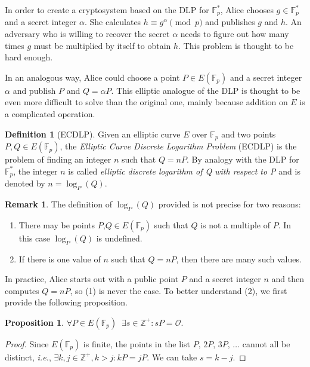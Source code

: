 \documentclass[9pt]{article}
\theoremstyle{definition}
\newtheorem{definition}{Definition}[section]
\newtheorem{proposition}{Proposition}[section]
\newtheorem*{remark}{Remark}
\begin{document}
In order to create a cryptosystem based on the DLP for $\mathbb{F}_p^\ast$, Alice chooses $g \in \mathbb{F}_p^\ast$ and a secret integer $\alpha$. She calculates $h \equiv g^\alpha \pmod{p}$ and publishes $g$ and $h$. An adversary who is willing to recover the secret $\alpha$ needs to figure out how many times $g$ must be multiplied by itself to obtain $h$. This problem is thought to be hard enough.

In an analogous way, Alice could choose a point $P \in E(\mathbb{F}_p)$ and a secret integer $\alpha$ and publish $P$ and $Q = \alpha P$. This elliptic analogue of the DLP is thought to be even more difficult to solve than the original one, mainly because addition on $E$ is a complicated operation.

\begin{definition}[ECDLP]
	Given an elliptic curve $E$ over $\mathbb{F}_p$ and two points $P, Q \in E(\mathbb{F}_p)$, the \textit{Elliptic Curve Discrete Logarithm Problem} (ECDLP) is the problem of finding an integer $n$ such that $Q = n P$. By analogy with the DLP for $\mathbb{F}_p^\ast$, the integer $n$ is called \textit{elliptic discrete logarithm of Q with respect to P} and is denoted by $n = \log_P(Q)$.
\end{definition}

\begin{remark}
	The definition of $\log_P(Q)$ provided is not precise for two reasons:
	\begin{enumerate}
		\item There may be points $P$,$Q \in E(\mathbb{F}_p)$ such that $Q$ is not a multiple of $P$. In this case $\log_P(Q)$ is undefined.
		\item If there is one value of $n$ such that $Q = n P$, then there are many such values.
	\end{enumerate}
\end{remark}

In practice, Alice starts out with a public point $P$ and a secret integer $n$ and then computes $Q = n P$, so (1) is never the case. To better understand (2), we first provide the following proposition.

\begin{proposition}
	$\forall P \in E(\mathbb{F}_p) \;\; \exists s \in \mathbb{Z}^+ : sP = \mathcal{O}$.
\end{proposition}

\begin{proof}
	Since $E(\mathbb{F}_p)$ is finite, the points in the list $P,\,2P,\,3P,\,\dots$ cannot all be distinct, \textit{i.e.}, $\exists k,j \in \mathbb{Z}^+, k > j : k P = j P$. We can take $s = k - j$.
\end{proof}
\end{document}
